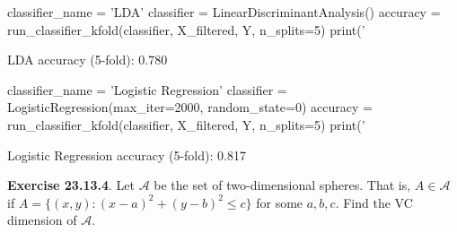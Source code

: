 \begin{python}
classifier_name = 'LDA'
classifier = LinearDiscriminantAnalysis()
accuracy = run_classifier_{k}fold(classifier, X_filtered, Y, n_splits=5)
print('%
\end{python}
\begin{console}
LDA accuracy (5-fold): 0.780
\end{console}

\begin{python}
classifier_name = 'Logistic Regression'
classifier = LogisticRegression(max_{i}ter=2000, random_state=0)
accuracy = run_classifier_{k}fold(classifier, X_filtered, Y, n_splits=5)
print('%
\end{python}
\begin{console}
Logistic Regression accuracy (5-fold): 0.817
\end{console}

\textbf{Exercise 23.13.4}. Let \(\mathcal{A}\) be the set of
two-dimensional spheres. That is, \(A \in \mathcal{A}\) if
\(A = \{ (x, y) : (x - a)^{2} + (y - b)^{2} \leq c \}\) for some
\(a, b, c\). Find the VC dimension of \(\mathcal{A}\).


